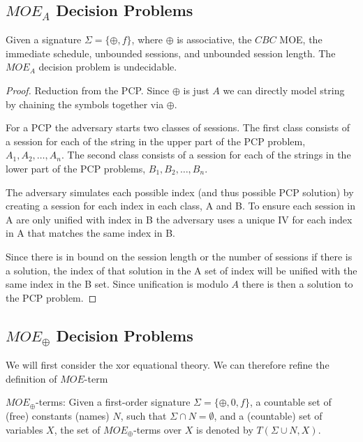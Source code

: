 \documentclass{llncs}
\begin{document}
\subsection{$MOE_A$ Decision Problems} 
\begin{conjecture}
	Given a signature $\Sigma=\{
	\oplus, f\}$, where $\oplus$ is associative, the $CBC$ MOE, the immediate  schedule, unbounded sessions, and unbounded session 
	length.  The $MOE_A$ decision problem is undecidable.
\end{conjecture}
\begin{proof}
	Reduction from the PCP. Since $\oplus$ is just $A$ we can directly
	model string by chaining the symbols together via $\oplus$.
	
	For a PCP the adversary starts two classes of sessions. 
	The first class consists of a session for each of the string
	in the upper part of the PCP problem, $A_1, A_2, \ldots, A_n$.
	The second class consists of a session for each of the strings
	in the lower part of the PCP problems, $B_1, B_2, \ldots, B_n$.
	
	The adversary simulates each possible index (and thus possible PCP
	solution) by creating a session for each index in each class, A and B. To ensure each session in A are only unified with index in B
	the adversary uses a unique IV for each index in A that matches the same index in B. 
	
	Since there is in bound on the session length
	or the number of sessions if there is a solution, the index of that
	solution in the A set of index will be unified with the same index in the B set. Since unification is modulo $A$ there is then a solution to the PCP problem.  
\end{proof}

\subsection{$MOE_{\oplus}$ Decision Problems}
We will first consider the xor equational theory. We can therefore refine the definition of $MOE$-term 
 
\begin{definition}
	$MOE_{\oplus}$-terms: Given a first-order signature $\Sigma=\{
	\oplus, 0, f\}$, a countable set of (free) constants (names) $N$, such that $\Sigma \cap N =\emptyset$, and a (countable) set of variables $X$, the set of $MOE_{\oplus}$-terms over $X$ is denoted by $T(\Sigma \cup N,X)$. 
\end{definition}
\end{document}
